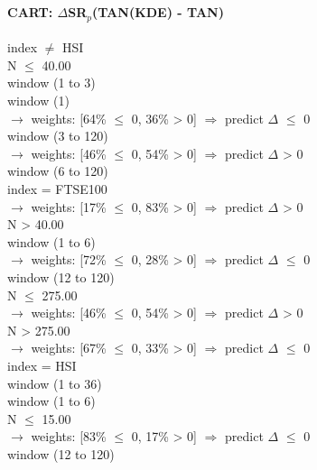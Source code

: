 \
\paragraph{CART: $\Delta$SR$_p$(TAN(KDE) - TAN)}

\begin{flushleft}
\ttfamily %
index $\neq$ HSI \\
\quad N $\leq$ 40.00 \\
\quad \quad window (1 to 3) \\
\quad \quad \quad window (1) \\
\quad \quad \quad \quad $\rightarrow$ weights: [64\% $\leq$ 0, 36\% > 0] $\Rightarrow$ predict $\Delta$ $\leq$ 0 \\
\quad \quad \quad window (3 to 120) \\
\quad \quad \quad \quad $\rightarrow$ weights: [46\% $\leq$ 0, 54\% > 0] $\Rightarrow$ predict $\Delta$ > 0 \\
\quad \quad window (6 to 120) \\
\quad \quad \quad index = FTSE100 \\
\quad \quad \quad \quad $\rightarrow$ weights: [17\% $\leq$ 0, 83\% > 0] $\Rightarrow$ predict $\Delta$ > 0 \\
\quad N > 40.00 \\
\quad \quad window (1 to 6) \\
\quad \quad \quad \quad $\rightarrow$ weights: [72\% $\leq$ 0, 28\% > 0] $\Rightarrow$ predict $\Delta$ $\leq$ 0 \\
\quad \quad window (12 to 120) \\
\quad \quad \quad N $\leq$ 275.00 \\
\quad \quad \quad \quad $\rightarrow$ weights: [46\% $\leq$ 0, 54\% > 0] $\Rightarrow$ predict $\Delta$ > 0 \\
\quad \quad \quad N > 275.00 \\
\quad \quad \quad \quad $\rightarrow$ weights: [67\% $\leq$ 0, 33\% > 0] $\Rightarrow$ predict $\Delta$ $\leq$ 0 \\
index = HSI \\
\quad window (1 to 36) \\
\quad \quad window (1 to 6) \\
\quad \quad \quad N $\leq$ 15.00 \\
\quad \quad \quad \quad $\rightarrow$ weights: [83\% $\leq$ 0, 17\% > 0] $\Rightarrow$ predict $\Delta$ $\leq$ 0 \\
\quad \quad window (12 to 120) \\

\end{flushleft}
